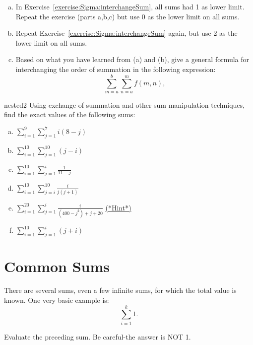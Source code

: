 \begin{exercise}{}
\begin{enumerate}[(a)]
\item
In Exercise~\ref{exercise:Sigma:interchangeSum}, all sums had 1 as lower limit.  Repeat the exercise (parts a,b,c) but use 0 as the lower limit on all sums.
\item
Repeat Exercise~\ref{exercise:Sigma:interchangeSum} again, but use 2 as the lower limit on all sums.
\item
Based on what you have learned from (a) and (b), give a general formula for interchanging the order of summation in the following expression:
\[
\sum_{m=a}^b \sum_{n=a}^m f(m,n),
\]
\end{enumerate}
\end{exercise}


\begin{exercise}{nested2}
Using exchange of summation and other sum manipulation techniques, find the exact values of the following sums:


\begin{multicols}{2}
\begin{enumerate}[(a)]
\item
$\displaystyle{\sum_{i=1}^{9} \sum_{j=1}^{7} i(8-j)}$
\item
$\displaystyle{\sum_{i=1}^{10} \sum_{j=1}^{10} (j-i)}$
\item
$\displaystyle{\sum_{i=1}^{10} \sum_{j=1}^i \frac{1}{11-j}}$
\item
$\displaystyle{\sum_{i=1}^{10} \sum_{j=i}^{10} \frac{i}{j(j+1)}}$
\item
$\displaystyle{\sum_{i=1}^{20} \sum_{j=1}^i \frac{i}{(400-j^2)+j+20}}$ \hyperref[sec:sigma:hints]{(*Hint*)} 
\item
$\displaystyle{\sum_{i=1}^{10} \sum_{j=1}^i (j+i)}$
\end{enumerate}
\end{multicols}
\end{exercise}

\section{Common Sums\quad
{}}\label{sec:CommonSums}
There are several sums, even a few infinite sums, for which the total value is known. One very basic example is:
\[\sum_{i=1}^{k}1.\]

\begin{exercise}{}
Evaluate the preceding sum. Be careful-the answer is NOT 1. 
\end{exercise}

